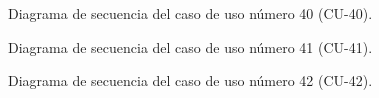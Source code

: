 \begin{figure}[htbp!]
	\begin{center}
		\caption{Diagrama de secuencia del caso de uso número 40 (CU-40).}
		\label{fig:Diagrama de secuencia CU-40}
	\end{center}
\end{figure}

\begin{figure}[htbp!]
	\begin{center}
		\caption{Diagrama de secuencia del caso de uso número 41 (CU-41).}
		\label{fig:Diagrama de secuencia CU-41}
	\end{center}
\end{figure}

\begin{figure}[htbp!]
	\begin{center}
		\caption{Diagrama de secuencia del caso de uso número 42 (CU-42).}
		\label{fig:Diagrama de secuencia CU-42}
	\end{center}
\end{figure}